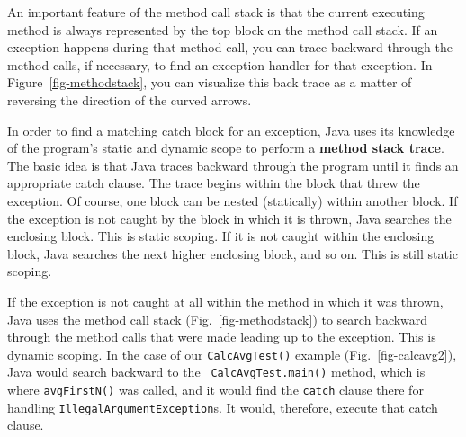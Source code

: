 An important feature of the method call stack is that the current
executing method 
is always represented by the top block on the method call
stack.   If an exception happens during that method call, you can trace
backward through the method calls, if necessary, to find an
exception handler for that exception.  In Figure~\ref{fig-methodstack},
you can visualize this back trace as a matter of reversing the
direction of the curved arrows.

\begin{figure}[tb]
\end{figure}

In order to find a matching catch block for an exception, Java 
uses its knowledge of the program's static and dynamic scope to
perform a {\bf method stack trace}.  The basic idea is that Java
traces backward through the program until it finds an appropriate
catch clause.  The trace begins within the block that threw the
exception.  Of course, one block can be nested (statically) within
another block.  If the exception is not caught by the block in which
it is thrown, Java searches the enclosing block.  This is static
scoping.  If it is not caught within the enclosing block, Java
searches the next higher enclosing block, and so on.  This is still
static scoping.

If the exception is not caught at all within the method in which it
was thrown, Java uses the method call stack
(Fig.~\ref{fig-methodstack}) to search backward through the method
calls that were made leading up to the exception.  This is dynamic
scoping.  In the case of our {\tt CalcAvgTest()} example
(Fig.~\ref{fig-calcavg2}), Java would search backward to the {\tt
CalcAvgTest.main()} method, which is where {\tt avgFirstN()} was
called, and it would find the {\tt catch} clause there for handling
{\tt IllegalArgumentException}s.  It would, therefore, execute that catch
clause.

